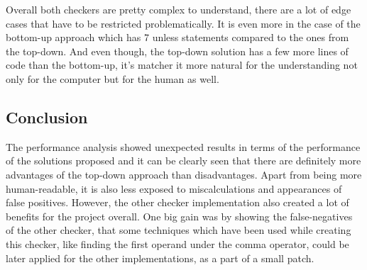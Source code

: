 Overall both checkers are pretty complex to understand, there are a lot of edge cases that have to be restricted problematically. It is even more in the case of the bottom-up approach which has 7 unless statements compared to the ones from the top-down. And even though, the top-down solution has a few more lines of code than the bottom-up, it's matcher it more natural for the understanding not only for the computer but for the human as well. 


\subsection{Conclusion}


The performance analysis showed unexpected results in terms of the performance of the solutions proposed and it can be clearly seen that there are definitely more advantages of the top-down approach than disadvantages. Apart from being more human-readable, it is also less exposed to miscalculations and appearances of false positives. However, the other checker implementation also created a lot of benefits for the project overall. One big gain was by showing the false-negatives of the other checker, that some techniques which have been used while creating this checker, like finding the first operand under the comma operator, could be later applied for the other implementations, as a part of a small patch. 